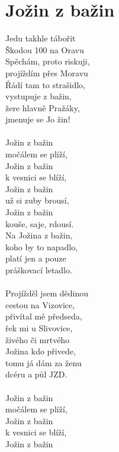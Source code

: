 \section{Jožin z bažin}
\begin{multicols}{2}
Jedu takhle tábořit\\
Škodou 100 na Oravu\\
Spěchám, proto riskuji,\\
projíždím přes Moravu\\
Řádí tam to strašidlo,\\
vystupuje z bažin,\\
žere hlavně Pražáky,\\
jmenuje se Jo  žin! \\
\\
Jožin z bažin\\
močálem se plíží,\\
Jožin z bažin\\
k vesnici se blíží, \\
Jožin z bažin\\
už si zuby brousí, \\
Jožin z bažin\\
kouše, saje, rdousí.\\
Na Jožina z bažin,\\
koho by to napadlo,\\
platí jen a pouze\\
práškovací letadlo. \\
\\
Projížděl jsem dědinou\\
cestou na Vizovice,\\
přivítal mě předseda,\\
řek mi u Slivovice, \\
živého či mrtvého\\
Jožina kdo přivede,\\
tomu já dám za ženu\\
dcéru a půl JZD. \\
\columnbreak
\\
Jožin z bažin\\
močálem se plíží, \\
Jožin z bažin\\
k vesnici se blíží, \\
Jožin z bažin\\

\end{multicols}
